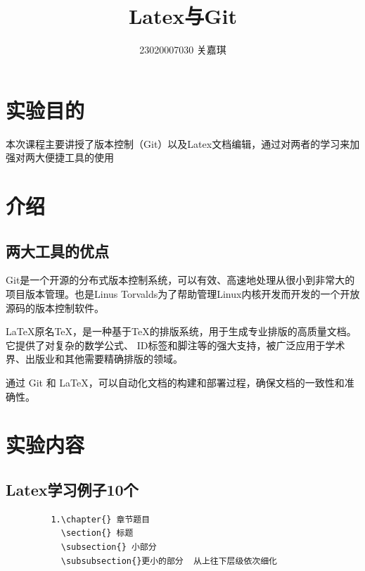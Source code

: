 \documentclass{article}
\title{Latex与Git}
\author{23020007030  关嘉琪}
\begin{document}
	
	\maketitle
	
	\section{实验目的}
	本次课程主要讲授了版本控制（Git）以及Latex文档编辑，通过对两者的学习来加强对两大便捷工具的使用
	
	\section{介绍}
	\subsection{两大工具的优点}
	Git是一个开源的分布式版本控制系统，可以有效、高速地处理从很小到非常大的项目版本管理。也是Linus Torvalds为了帮助管理Linux内核开发而开发的一个开放源码的版本控制软件。
	
	LaTeX原名TeX，是一种基于TeX的排版系统，用于生成专业排版的高质量文档。它提供了对复杂的数学公式、 ID标签和脚注等的强大支持，被广泛应用于学术界、出版业和其他需要精确排版的领域。
	
	通过 Git 和 LaTeX，可以自动化文档的构建和部署过程，确保文档的一致性和准确性。
	\section{实验内容}
	\subsection{Latex学习例子10个}
	
	\begin{verbatim}
		 1.\chapter{} 章节题目
		   \section{} 标题
		   \subsection{} 小部分
		   \subsubsection{}更小的部分  从上往下层级依次细化
	\end{verbatim}
	
\end{document}
